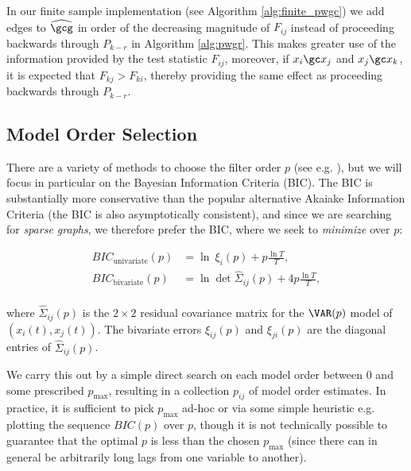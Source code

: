 In our finite sample implementation (see Algorithm
\ref{alg:finite_pwgc}) we add edges to $\widehat{\gcg}$ in order of
the decreasing magnitude of $F_{ij}$ instead of proceeding backwards
through $P_{k - r}$ in Algorithm \ref{alg:pwgr}.  This makes greater
use of the information provided by the test statistic $F_{ij}$,
moreover, if $x_i \gc x_j$ and $x_j \gc x_k$, it is expected that
$F_{kj} > F_{ki}$, thereby providing the same effect as proceeding
backwards through $P_{k - r}$.
\subsection{Model Order Selection}
\label{sec:model_order_selection}
There are a variety of methods to choose the filter order $p$ (see
e.g. \cite{lutkepohl2005new}), but we will focus in particular on the
Bayesian Information Criteria (BIC).  The BIC is substantially more
conservative than the popular alternative Akaiake Information Criteria
(the BIC is also asymptotically consistent), and since we are
searching for \textit{sparse graphs}, we therefore prefer the BIC,
where we seek to \textit{minimize} over $p$:

\begin{equation}
  \label{eqn:bic}
  \begin{aligned}
    BIC_{\text{univariate}}(p) &= \ln\ \xi_i(p) + p\frac{\ln T}{T},\\
    BIC_{\text{bivariate}}(p) &= \ln \det \widehat{\Sigma}_{ij}(p) + 4p\frac{\ln T}{T},\\
  \end{aligned}
\end{equation}

where $\widehat{\Sigma}_{ij}(p)$ is the $2 \times 2$ residual
covariance matrix for the $\VAR(p)$ model of $(x_i(t), x_j(t))$.  The
bivariate errors $\xi_{ij}(p)$ and $\xi_{ji}(p)$ are the diagonal
entries of $\widehat{\Sigma}_{ij}(p)$.

We carry this out by a simple direct search on each model order
between $0$ and some prescribed $p_\text{max}$, resulting in a
collection $p_{ij}$ of model order estimates.  In practice, it is
sufficient to pick $p_\text{max}$ ad-hoc or via some simple heuristic
e.g. plotting the sequence $BIC(p)$ over $p$, though it is not
technically possible to guarantee that the optimal $p$ is less than
the chosen $p_\text{max}$ (since there can in general be arbitrarily
long lags from one variable to another).


